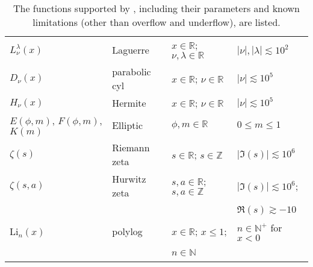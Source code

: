 \begin{table}[p]
\begin{center}
\begin{tabular}{l|l|l|l}
$L_{\nu}^{\lambda}(x)$
             & Laguerre
             & $x \in \mathbb{R}$; $\nu,\lambda \in \mathbb{R}$
             & $\left|\nu\right|$,$\,\left|\lambda\right| \lesssim 10^{2}$ \\

$D_{\nu}(x)$
             & parabolic cyl
             & $x \in \mathbb{R}$; $\nu \in \mathbb{R}$
             & $\left|\nu\right| \lesssim 10^{5}$ \\

$H_{\nu}(x)$
             & Hermite
             & $x \in \mathbb{R}$; $\nu \in \mathbb{R}$
             & $\left|\nu\right| \lesssim 10^{5}$ \\

$E(\phi, m)$, $F(\phi, m)$, $K(m)$
             & Elliptic
             & $\phi, m \in \mathbb{R}$
             & $0 \leq m \leq 1$ \\

$\zeta(s)$
             & Riemann zeta
             & $s \in \mathbb{R}$; $s \in \mathbb{Z}$
             & $\left|\Im(s)\right| \lesssim 10^{6}$ \\

$\zeta(s, a)$
             & Hurwitz zeta
             & $s, a \in \mathbb{R}$; $s, a \in \mathbb{Z}$
             & $\left|\Im(s)\right| \lesssim 10^{6}$; \\

\ %
             & \ %
             & \ %
             & $\Re(s) \gtrsim -10$ \\

Li$_n(x)$
             & poly\-log
             & $x \in \mathbb{R}$; $x \leq 1$;
             & $n \in \mathbb{N}^{+}$ for $x < 0$ \\

\ %
             & \ %
             & $n \in \mathbb{N}$
             & \ \\
\hline
\end{tabular}
\vspace{2.0mm}
\caption{The functions supported by \efloat, including their parameters
and known limitations (other than overflow and underflow), are listed.}
\label{table:functions}
\end{center}
\end{table}
